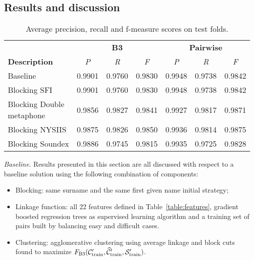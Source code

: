 \documentclass{article}
\begin{document}
\subsection{Results and discussion}

\begin{table}
\caption{Average precision, recall and f-measure scores on test folds.}
\label{table:results}
\centering
\begin{tabular}{|l|c c c|c c c|}
  \hline
                       & \multicolumn{3}{|c|}{\textbf{B3}} & \multicolumn{3}{|c|}{\textbf{Pairwise}} \\
  \textbf{Description} & \textit{P} & \textit{R} & \textit{F} & \textit{P} & \textit{R} & \textit{F}\\
  \hline
  \hline
  Baseline & 0.9901 & 0.9760 & 0.9830 & 0.9948 & 0.9738 & 0.9842 \\
  \hline
  Blocking SFI & 0.9901 & 0.9760 & 0.9830 & 0.9948 & 0.9738 & 0.9842 \\
  Blocking Double metaphone & 0.9856 & 0.9827 & 0.9841 & 0.9927 & 0.9817 & 0.9871 \\
  Blocking NYSIIS & 0.9875 & 0.9826 & 0.9850 & 0.9936 & 0.9814 & 0.9875 \\
  Blocking Soundex & 0.9886 & 0.9745 & 0.9815 & 0.9935 & 0.9725 & 0.9828 \\
  \hline
\end{tabular}
\end{table}

\textit{Baseline.} Results presented in this section are all discussed with
respect to a baseline solution using the following combination of components:
\begin{itemize}
\item Blocking: same surname and the same first given name initial strategy;
\item Linkage function: all 22 features defined in Table~\ref{table:features},
    gradient boosted regression trees as supervised learning algorithm
    and a training set of pairs built by balancing easy and difficult cases.
\item Clustering: agglomerative clustering using average linkage and
    block cuts found to maximize $F_\text{B3}({\cal C}_\text{train}^\prime, \widehat{\cal C}_\text{train}^\prime, {\cal S}_\text{train}^\prime)$.
\end{itemize}
\end{document}
